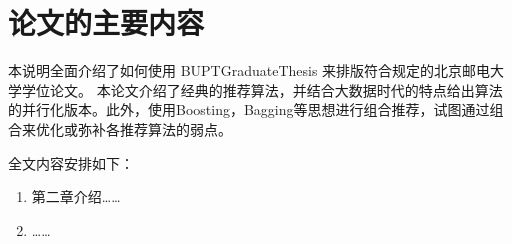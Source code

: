 \section{论文的主要内容}
本说明全面介绍了如何使用 BUPTGraduateThesis 来排版符合规定的北京邮电大学学位论文。
本论文介绍了经典的推荐算法，并结合大数据时代的特点给出算法的并行化版本。此外，使用Boosting，Bagging等思想进行组合推荐，试图通过组合来优化或弥补各推荐算法的弱点。

全文内容安排如下：
\begin{enumerate}
\item 第二章介绍……
\item ……
\end{enumerate}

\ifx\usechapbib\empty
\nocite{BSTcontrol}
\setcounter{NAT@ctr}{0}


\fi
